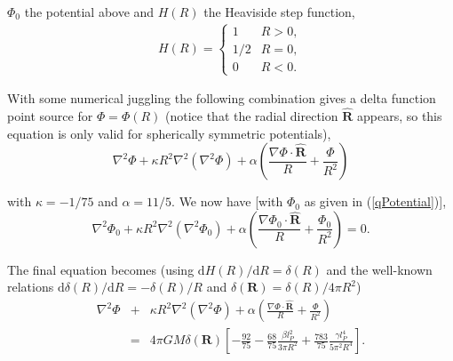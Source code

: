 \documentclass[nofootinbib,aps,prd,preprint,groupedaddress,showpacs,showkeys]{revtex4-1}
\newcommand{\dif}{\mathrm{d}}
\begin{document}
\noindent $\Phi_0$ the potential above and $H(R)$ the Heaviside step function,
\begin{eqnarray}
H(R) = \left\{
\begin{array}{ll}
1 & R>0, \\
1/2 & R=0, \\
0 & R<0.
\end{array} \right.
\end{eqnarray}

\noindent With some numerical juggling the following combination gives a delta function point source for $\Phi = \Phi (R)$ (notice that the radial direction $\hat{\mathbf{R}}$ appears, so this equation is only valid for spherically symmetric potentials),
\begin{equation}
\nabla^2 \Phi + \kappa R^2 \nabla^2 (\nabla^2 \Phi) + \alpha \left( \frac{\nabla \Phi \cdot \hat{\mathbf{R}}}{R} + \frac{\Phi}{R^2} \right)
\end{equation}

\noindent with $\kappa = -1/75$ and $\alpha = 11/5$. We now have [with $\Phi_0$ as given in (\ref{qPotential})],
\begin{equation}
\nabla^2 \Phi_0 + \kappa R^2 \nabla^2 (\nabla^2 \Phi_0) + \alpha \left( \frac{\nabla \Phi_0 \cdot \hat{\mathbf{R}}}{R} + \frac{\Phi_0}{R^2} \right) = 0.
\end{equation}

\noindent The final equation becomes (using $\dif H(R)/ \dif R = \delta(R)$ and the well-known relations $\dif \delta (R) / \dif R = - \delta(R) / R$ and $\delta (\mathbf{R}) = \delta (R) / 4 \pi R^2$)
\begin{eqnarray}
\nabla^2 \Phi &+& \kappa R^2 \nabla^2 (\nabla^2 \Phi) + \alpha \left( \frac{\nabla \Phi \cdot \hat{\mathbf{R}}}{R} + \frac{\Phi}{R^2} \right) \nonumber \\
&=& 4 \pi GM \delta (\mathbf{R}) \left[-\frac{92}{75} - \frac{68}{75} \frac{\beta l_P^2}{3 \pi R^2} + \frac{783}{75} \frac{\gamma l_P^4}{5 \pi^2 R^4} \right]. \label{laplacian1}
\end{eqnarray}
\end{document}
